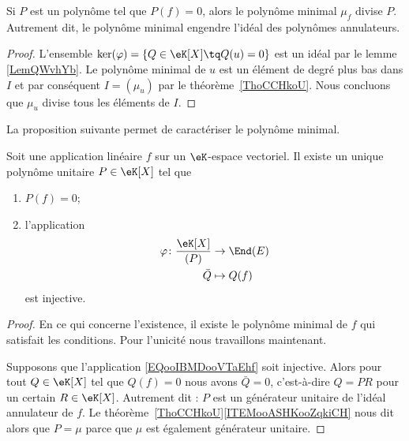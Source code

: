 \begin{proposition}     \label{PropAnnncEcCxj}
    Si \( P\) est un polynôme tel que \( P(f)=0\), alors le polynôme minimal \( \mu_f\) divise \( P\). Autrement dit, le polynôme minimal engendre l'idéal des polynômes annulateurs.
\end{proposition}

\begin{proof}
    L'ensemble \( \ker(\varphi)=\{ Q\in \eK[X]\tq Q(u)=0 \} \) est un idéal par le lemme \ref{LemQWvhYb}. Le polynôme minimal de \( u\) est un élément de degré plus bas dans \( I\) et par conséquent \( I=(\mu_u)\) par le théorème~\ref{ThoCCHkoU}. Nous concluons que \( \mu_u\) divise tous les éléments de \( I\).
\end{proof}

La proposition suivante permet de caractériser le polynôme minimal.
\begin{proposition}      \label{PROPooVUJPooMzxzjE}
    Soit une application linéaire \( f\) sur un \( \eK\)-espace vectoriel. Il existe un unique polynôme unitaire \( P\in \eK[X]\) tel que
    \begin{enumerate}
        \item
            \( P(f)=0\);
        \item
            l'application
            \begin{equation}        \label{EQooIBMDooVTaEhf}
                \begin{aligned}
                    \varphi\colon \frac{ \eK[X] }{ (P) }&\to \End(E) \\
                    \bar Q&\mapsto Q(f)
                \end{aligned}
            \end{equation}
            est injective.
    \end{enumerate}
\end{proposition}

\begin{proof}
    En ce qui concerne l'existence, il existe le polynôme minimal de \( f\) qui satisfait les conditions. Pour l'unicité nous travaillons maintenant.

    Supposons que l'application \eqref{EQooIBMDooVTaEhf} soit injective. Alors pour tout \( Q\in \eK[X]\) tel que \( Q(f)=0\) nous avons \( \bar Q=0\), c'est-à-dire \( Q=PR\) pour un certain \( R\in \eK[X]\). Autrement dit : \( P\) est un générateur unitaire de l'idéal annulateur de \( f\). Le théorème~\ref{ThoCCHkoU}\ref{ITEMooASHKooZqkiCH} nous dit alors que \( P=\mu\) parce que \( \mu\) est également générateur unitaire.
\end{proof}

